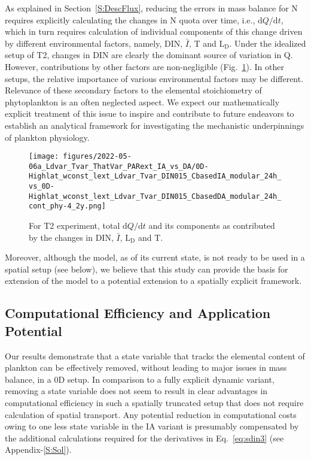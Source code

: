 \documentclass[gmd, manuscript]{copernicus}
\newcommand{\onur}[1]{\textcolor{blue}{\{Onur: #1\}}}
\begin{document}
As explained in Section~\ref{S:DescFlux}, reducing the errors in mass balance for N requires explicitly calculating the changes in N quota over time, i.e., $\textrm{d}Q/\textrm{d}t$, which in turn requires calculation of individual components of this change driven by different environmental factors, namely, DIN, $\bar{I}$, T and $\textrm{L}_{\textrm{D}}$.  Under the idealized setup of T2, changes in DIN are clearly the dominant source of variation in Q.  However, contributions by other factors are non-negligible (Fig.~\ref{f.T2dQdt}). In other setups, the relative importance of various environmental factors may be different. Relevance of these secondary factors to the elemental stoichiometry of phytoplankton is an often neglected aspect. We expect our mathematically explicit treatment of this issue to inspire and contribute to future endeavors to establish an analytical framework for investigating the mechanistic underpinnings of plankton physiology.

\begin{figure}[ht!]
\texttt{[image: figures/2022-05-06a\_Ldvar\_Tvar\_ThatVar\_PARext\_IA\_vs\_DA/0D-Highlat\_wconst\_lext\_Ldvar\_Tvar\_DIN015\_CbasedIA\_modular\_24h\_vs\_0D-Highlat\_wconst\_lext\_Ldvar\_Tvar\_DIN015\_CbasedDA\_modular\_24h\_cont\_phy-4\_2y.png]}
\caption{For T2 experiment, total $\textrm{d}Q/\textrm{d}t$ and its components as contributed by the changes in DIN, $\bar{I}$, $\textrm{L}_{\textrm{D}}$ and T.\label{f.T2dQdt}}
\end{figure}

 Moreover, although the model, as of its current state, is not ready to be used in a spatial setup (see below), we believe that this study can provide the basis for extension of the model to a potential extension to a spatially explicit framework.

\FloatBarrier
\subsection{Computational Efficiency and Application Potential}

Our results demonstrate that a state variable that tracks the elemental content of plankton can be effectively removed, without leading to major issues in mass balance, in a 0D setup. In comparison to a fully explicit dynamic variant, removing a state variable does not seem to result in clear advantages in computational efficiency in such a spatially truncated setup that does not require calculation of spatial transport.
Any potential reduction in computational costs owing to one less state variable in the IA variant is presumably compensated by the additional calculations required for the derivatives in Eq.~\eqref{eq:sdin3} (see Appendix-\ref{S:Sol}).
\end{document}

